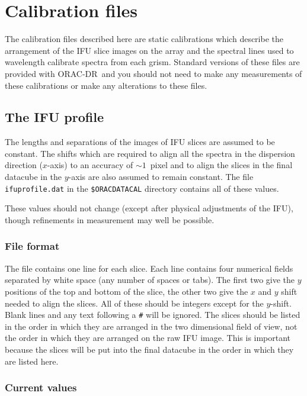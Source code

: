\documentclass[twoside,11pt]{article}
\renewcommand{\_}{\texttt{\symbol{95}}}
\newcommand{\ORACDR}{{\footnotesize ORAC-DR}}
\begin{document}
\section{Calibration files}

The calibration files described here are static calibrations which
describe the arrangement of the IFU slice images on the array and the
spectral lines used to wavelength calibrate spectra from each
grism. Standard versions of these files are provided with \ORACDR\ and
you should not need to make any measurements of these calibrations or
make any alterations to these files.

\subsection{The IFU profile}

The lengths and separations of the images of IFU slices are assumed to
be constant. The shifts which are required to align all the spectra in
the dispersion direction ($x$-axis) to an accuracy of $\sim 1$~pixel
and to align the slices in the final datacube in the $y$-axis are also
assumed to remain constant. The file {\tt ifu\_profile.dat} in the
{\tt \$ORAC\_DATA\_CAL} directory contains all of these values. 

These values should not change (except after physical adjustments of
the IFU), though refinements in measurement may well be possible.

\subsubsection{File format}

The file contains one line for each slice. Each line contains four
numerical fields separated by white space (any number of spaces or
tabs). The first two give the $y$ positions of the top and bottom of
the slice, the other two give the $x$ and $y$ shift needed to align
the slices. All of these should be integers except for the
$y$-shift. Blank lines and any text following a {\tt \#} will be
ignored. The slices should be listed in the order in which they are
arranged in the two dimensional field of view, not the order in which
they are arranged on the raw IFU image. This is important because the
slices will be put into the final datacube in the order in which they
are listed here.


\subsubsection{Current values}
\end{document}
